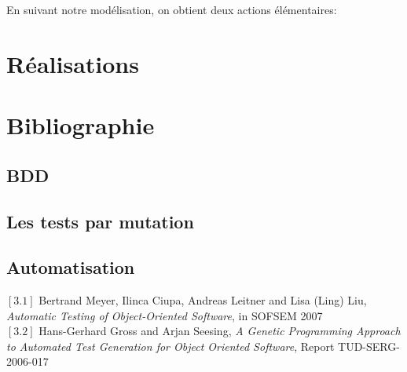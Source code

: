 \documentclass[a4paper]{report}
\begin{document}
En suivant notre modélisation, on obtient deux actions élémentaires:


\chapter*{Réalisations}


\chapter*{Bibliographie}
\section*{BDD}

\section*{Les tests par mutation}

\section*{Automatisation}

$[3.1]$ Bertrand Meyer, Ilinca Ciupa, Andreas Leitner and Lisa (Ling) Liu, \textit{Automatic Testing of Object-Oriented Software}, in SOFSEM 2007\\
$[3.2]$ Hans-Gerhard Gross and Arjan Seesing, 
\textit{A Genetic Programming Approach to Automated Test Generation for Object Oriented Software}, Report TUD-SERG-2006-017
\end{document}
